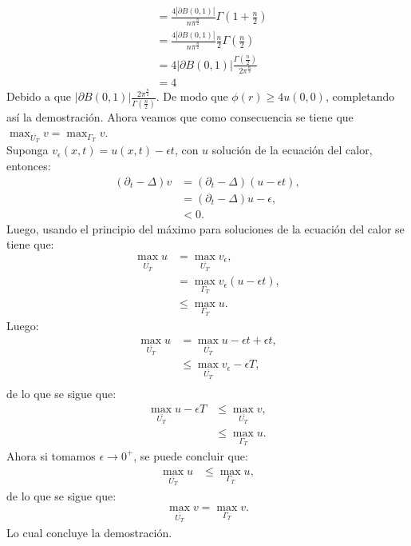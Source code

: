 \begin{homeworkProblem}
\begin{solucion}
\begin{align*}
      &= \frac{4|\partial B(0,1)|}{n \pi^{\frac{n}{2}}} \Gamma(1+ \frac{n}{2})\\
      &= \frac{4|\partial B(0,1)|}{n \pi^{\frac{n}{2}}} \frac{n}{2} \Gamma (\frac{n}{2})\\
      &= 4|\partial B(0,1)| \frac{\Gamma(\frac{n}{2})}{2\pi ^{\frac{n}{2}}}\\ 
      &= 4
    \end{align*}
    Debido a que $|\partial B(0,1)| \frac{2\pi ^{\frac{n}{2}}}{\Gamma(\frac{n}{2})}$. De modo que $\phi(r) \geq 4u(0,0)$, completando así la demostración.
    \demostrado
    Ahora veamos que como consecuencia se tiene que $\max_{\overline{U_T}}v=\max_{\Gamma_T}v$.\\
    Suponga $v_{\epsilon}(x,t)=u(x,t)-\epsilon t$, con $u$ solución de la ecuación del calor, entonces:
    \begin{align*}
      (\partial_t-\Delta)v&=(\partial_t-\Delta)(u-\epsilon t),\\
      &=(\partial_t-\Delta)u - \epsilon,\\
      &< 0 .
    \end{align*}
    Luego, usando el principio del máximo para soluciones de la ecuación del calor se tiene que:
    \begin{align*}
      \max_{\overline{U_T}}u&=\max_{\overline{U_T}}v_\epsilon,\\
      &=\max_{\Gamma_T}v_\epsilon(u-\epsilon t),\\
      &\leq \max_{\Gamma_T}u.
    \end{align*}
    Luego:
    \begin{align*}
      \max_{\overline{U_T}}u&=\max_{\overline{U_T}}u-\epsilon t + \epsilon t,\\
      &\leq \max_{\overline{U_T}}v_\epsilon -\epsilon T,\\
    \end{align*}
    de lo que se sigue que:
    \begin{align*}
      \max_{\overline{U_T}}u-\epsilon T&\leq \max_{\overline{U_T}}v,\\
      &\leq \max_{\Gamma_T}u.
    \end{align*}
    Ahora si tomamos $\epsilon\rightarrow 0^+$, se puede concluir que:
    \begin{align*}
      \max_{\overline{U_T}}u&\leq \max_{\Gamma_T}u, 
    \end{align*}
    de lo que se sigue que:
    \begin{align*}
      \max_{\overline{U_T}}v=\max_{\Gamma_T}v.
    \end{align*}
    Lo cual concluye la demostración.
    \demostrado
  \end{solucion}  
\end{homeworkProblem}
